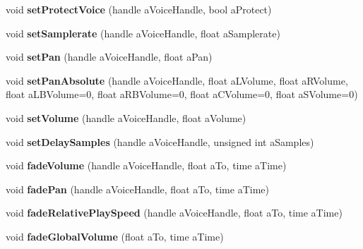 \begin{DoxyCompactItemize}
void {\bfseries set\+Protect\+Voice} (handle a\+Voice\+Handle, bool a\+Protect)
\item 
\mbox{\label{class_so_loud_1_1_soloud_a1a6e400c35e543ed70c7be3ae808b4da}} 
void {\bfseries set\+Samplerate} (handle a\+Voice\+Handle, float a\+Samplerate)
\item 
\mbox{\label{class_so_loud_1_1_soloud_a2c78e611871ef145b976a5c717c8d865}} 
void {\bfseries set\+Pan} (handle a\+Voice\+Handle, float a\+Pan)
\item 
\mbox{\label{class_so_loud_1_1_soloud_a31b07a9d4c8ff56adaf397586a7483a8}} 
void {\bfseries set\+Pan\+Absolute} (handle a\+Voice\+Handle, float a\+L\+Volume, float a\+R\+Volume, float a\+L\+B\+Volume=0, float a\+R\+B\+Volume=0, float a\+C\+Volume=0, float a\+S\+Volume=0)
\item 
\mbox{\label{class_so_loud_1_1_soloud_a1e6f5c43489244f0d6495845a310508c}} 
void {\bfseries set\+Volume} (handle a\+Voice\+Handle, float a\+Volume)
\item 
\mbox{\label{class_so_loud_1_1_soloud_a009c703c8db214d6452b77456f57b56a}} 
void {\bfseries set\+Delay\+Samples} (handle a\+Voice\+Handle, unsigned int a\+Samples)
\item 
\mbox{\label{class_so_loud_1_1_soloud_af6ac66de9742499dd616de099758f344}} 
void {\bfseries fade\+Volume} (handle a\+Voice\+Handle, float a\+To, time a\+Time)
\item 
\mbox{\label{class_so_loud_1_1_soloud_aaac0c9adda71d06262455b78dea8d965}} 
void {\bfseries fade\+Pan} (handle a\+Voice\+Handle, float a\+To, time a\+Time)
\item 
\mbox{\label{class_so_loud_1_1_soloud_aa056f4f17f729fe00db005b5ecc4b565}} 
void {\bfseries fade\+Relative\+Play\+Speed} (handle a\+Voice\+Handle, float a\+To, time a\+Time)
\item 
\mbox{\label{class_so_loud_1_1_soloud_a4722c8b333f053aa5e41f73283cadfad}} 
void {\bfseries fade\+Global\+Volume} (float a\+To, time a\+Time)

\end{DoxyCompactItemize}
